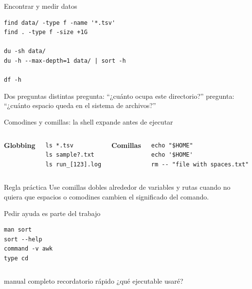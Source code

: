 \documentclass[aspectratio=169,11pt]{beamer}
\begin{document}
\begin{frame}[fragile]{Encontrar y medir datos}
\begin{lstlisting}
find data/ -type f -name '*.tsv'
find . -type f -size +1G

du -sh data/
du -h --max-depth=1 data/ | sort -h

df -h
\end{lstlisting}
  \vspace{4mm}
  \begin{wideblock}{Dos preguntas distintas}
     pregunta: ``¿cuánto ocupa este directorio?'' \qquad
     pregunta: ``¿cuánto espacio queda en el sistema de archivos?''
  \end{wideblock}
\end{frame}

\begin{frame}[fragile]{Comodines y comillas: la shell expande antes de ejecutar}
  \begin{columns}[T,onlytextwidth]
      \textbf{Globbing}
\begin{lstlisting}
ls *.tsv
ls sample?.txt
ls run_[123].log
\end{lstlisting}
      \textbf{Comillas}
\begin{lstlisting}
echo "$HOME"
echo '$HOME'
rm -- "file with spaces.txt"
\end{lstlisting}
  \end{columns}
  \vspace{6mm}
  \begin{wideblock}{Regla práctica}
    Use comillas dobles alrededor de variables y rutas cuando no quiera que espacios o comodines cambien el significado del comando.
  \end{wideblock}
\end{frame}

\begin{frame}[fragile]{Pedir ayuda es parte del trabajo}
\begin{lstlisting}
man sort
sort --help
command -v awk
type cd
\end{lstlisting}
  \vspace{5mm}
  \begin{columns}[T,onlytextwidth]
    \quad manual completo
    \quad recordatorio rápido
    \quad ¿qué ejecutable usaré?
  \end{columns}
\end{frame}
\end{document}
